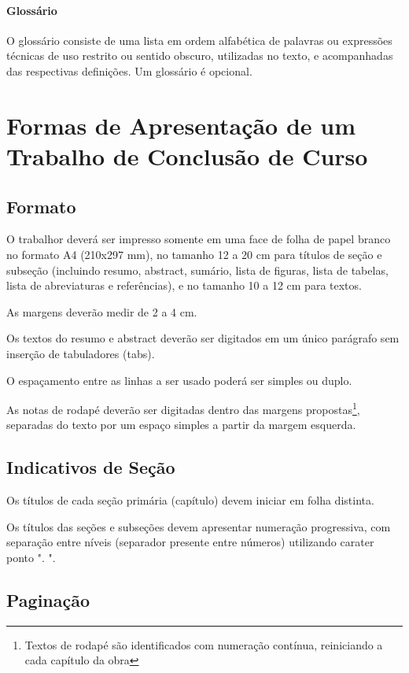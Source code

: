 \documentclass[repeatfields,xlists,xpacks,oneside]{ufrgscca}
\begin{document}
\subsubsection{Glossário}

O glossário consiste de uma lista em ordem alfabética de palavras ou
expressões técnicas de uso restrito ou sentido obscuro, utilizadas no texto,
e acompanhadas das respectivas definições. Um glossário é opcional.

\chapter{Formas de Apresentação de um Trabalho de Conclusão de Curso}
\label{formas}

\section{Formato}

O trabalhor deverá ser impresso somente em uma face de folha de papel
branco no formato A4 (210x297 mm), no tamanho 12 a 20 cm para títulos de
seção e subseção (incluindo resumo, abstract, sumário, lista de figuras,
lista de tabelas, lista de abreviaturas e referências), e no tamanho 10 a 12
cm para textos.

As margens deverão medir de 2 a 4 cm.

Os textos do resumo e abstract deverão ser digitados em um único parágrafo
sem inserção de tabuladores (tabs).

O espaçamento entre as linhas a ser usado poderá ser simples ou duplo.

As notas de rodapé deverão ser digitadas dentro das margens
propostas\footnote{Textos de rodapé são identificados com numeração
contínua, reiniciando a cada capítulo da obra}, separadas do texto por um
espaço simples a partir da margem esquerda.

\section{Indicativos de Seção}

Os títulos de cada seção primária (capítulo) devem iniciar em folha
distinta.

Os títulos das seções e subseções devem apresentar numeração progressiva,
com separação entre níveis (separador presente entre números) utilizando
carater ponto ". ".

\section{Paginação}
\end{document}
